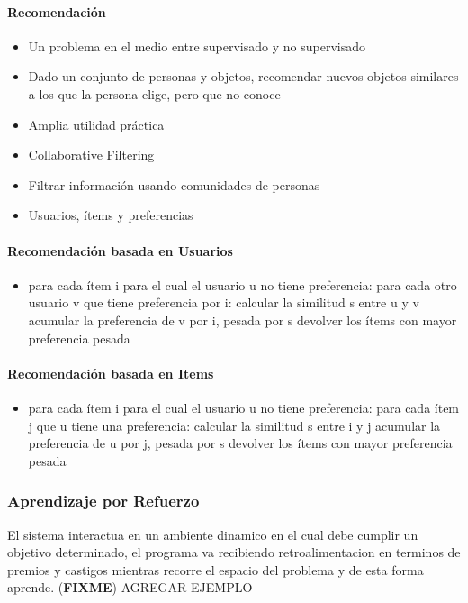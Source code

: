\documentclass[a4paper,11pt,spanish]{book}
\newcommand*{\FIXME}[1]{{(\textbf{FIXME}) {#1}}}
\begin{document}
	\paragraph{Recomendación}
	  \begin{itemize}
	    \item Un problema en el medio entre supervisado y no supervisado
	    \item Dado un conjunto de personas y objetos, recomendar nuevos objetos similares a los que la persona elige, pero que no conoce
	    \item Amplia utilidad práctica
	    \item Collaborative Filtering
	    \item Filtrar información usando comunidades de personas
	    \item Usuarios, ítems y preferencias
	  \end{itemize}
	\paragraph {Recomendación basada en Usuarios}
	  \begin{itemize}
	    \item para cada ítem i para el cual el usuario u no tiene preferencia:
	      \subitem para cada otro usuario v que tiene preferencia por i:
		\subsubitem calcular la similitud s entre u y v
		\subsubitem acumular la preferencia de v por i, pesada por s
		\subsubitem devolver los ítems con mayor preferencia pesada
	  \end{itemize}
	\paragraph {Recomendación basada en Items}
	  \begin{itemize}
	    \item para cada ítem i para el cual el usuario u no tiene preferencia:
	      \subitem para cada ítem j que u tiene una preferencia:
		\subsubitem calcular la similitud s entre i y j
		\subsubitem acumular la preferencia de u por j, pesada por s
		\subsubitem devolver los ítems con mayor preferencia pesada
	  \end{itemize}
      
      \subsubsection{Aprendizaje por Refuerzo}
	El sistema interactua en un ambiente dinamico en el cual debe cumplir un objetivo determinado, el programa va recibiendo retroalimentacion en terminos de premios y castigos mientras 
	recorre el espacio del problema y de esta forma aprende.
	\FIXME{AGREGAR EJEMPLO}
\end{document}
